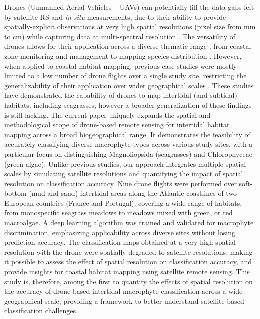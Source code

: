 \documentclass[
  number]{elsarticle}
\begin{document}
Drones (Unmanned Aerial Vehicles -- UAVs) can potentially fill the data
gaps left by satellite RS and \emph{in situ} measurements, due to their
ability to provide spatially-explicit observations at very high spatial
resolutions (pixel size from mm to cm) while capturing data at
multi-spectral resolution \citep{fairley2022drone, oh2017use}. The
versatility of drones allows for their application across a diverse
thematic range , from coastal zone monitoring and management
\citep{adade2021, casella2020, angnuureng2022, lange2022large, svane2022unoccupied}
to mapping species distribution
\citep{joyce2023, tallam2023, Roca2022, Roman2021, Brunier2022Topographic, sousa2019blue, svane2022unoccupied}.
However, when applied to coastal habitat mapping, previous case studies
were mostly limited to a low number of drone flights over a single study
site, restricting the generalizability of their application over wider
geographical scales
\citep{Roman2021, collin2019improving, rossiter2020uav, Brunier2022Topographic}.
These studies have demonstrated the capability of drones to map
intertidal (and subtidal) habitats, including seagrasses; however a
broader generalization of these findings is still lacking. The current
paper uniquely expands the spatial and methodological scope of
drone-based remote sensing for intertidal habitat mapping across a broad
biogeographical range. It demonstrates the feasibility of accurately
classifying diverse macrophyte types across various study sites, with a
particular focus on distinguishing Magnoliopsida (seagrasses) and
Chlorophyceae (green algae). Unlike previous studies, our approach
integrates multiple spatial scales by simulating satellite resolutions
and quantifying the impact of spatial resolution on classification
accuracy. Nine drone flights were performed over soft-bottom (mud and
sand) intertidal areas along the Atlantic coastlines of two European
countries (France and Portugal), covering a wide range of habitats, from
monospecific seagrass meadows to meadows mixed with green, or red
macroalgae. A deep learning algorithm was trained and validated for
macrophyte discrimination, emphasizing applicability across diverse
sites without losing prediction accuracy. The classification maps
obtained at a very high spatial resolution with the drone were spatially
degraded to satellite resolutions, making it possible to assess the
effect of spatial resolution on classification accuracy, and provide
insights for coastal habitat mapping using satellite remote sensing.
This study is, therefore, among the first to quantify the effects of
spatial resolution on the accuracy of drone-based intertidal macrophyte
classification across a wide geographical scale, providing a framework
to better understand satellite-based classification challenges.
\end{document}

